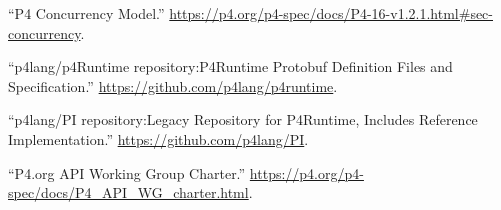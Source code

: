 \documentclass[11pt]{article}
\begin{document}
{{\begin{thebibliography}{44}
\mdbibitemlabel{{}[17]}\textquotedblleft{}P4 Concurrency Model.\textquotedblright{} \href{https://p4.org/p4-spec/docs/P4-16-v1.2.1.html\%23sec-concurrency}{{\ttfamily https://\hspace{0pt}p4.\hspace{0pt}org/\hspace{0pt}p4-\hspace{0pt}spec/\hspace{0pt}docs/\hspace{0pt}P4-\hspace{0pt}16-\hspace{0pt}v1.\hspace{0pt}2.\hspace{0pt}1.\hspace{0pt}html\#\hspace{0pt}sec-\hspace{0pt}concurrency}}.\label{p4concurrency}%

\mdbibitemlabel{{}[18]}\textquotedblleft{}p4lang/p4Runtime repository:P4Runtime Protobuf Definition Files and Specification.\textquotedblright{} \href{https://github.com/p4lang/p4runtime}{{\ttfamily https://\hspace{0pt}github.\hspace{0pt}com/\hspace{0pt}p4lang/\hspace{0pt}p4runtime}}.\label{p4runtimerepo}%

\mdbibitemlabel{{}[19]}\textquotedblleft{}p4lang/PI repository:Legacy Repository for P4Runtime, Includes Reference Implementation.\textquotedblright{} \href{https://github.com/p4lang/PI}{{\ttfamily https://\hspace{0pt}github.\hspace{0pt}com/\hspace{0pt}p4lang/\hspace{0pt}PI}}.\label{pirepo}%

\mdbibitemlabel{{}[20]}\textquotedblleft{}P4.org API Working Group Charter.\textquotedblright{} \href{https://p4.org/p4-spec/docs/P4_API_WG_charter.html}{{\ttfamily https://\hspace{0pt}p4.\hspace{0pt}org/\hspace{0pt}p4-\hspace{0pt}spec/\hspace{0pt}docs/\hspace{0pt}P4\_\hspace{0pt}API\_\hspace{0pt}WG\_\hspace{0pt}charter.\hspace{0pt}html}}.\label{p4apiwgcharter}%


\end{thebibliography}}}
\end{document}
